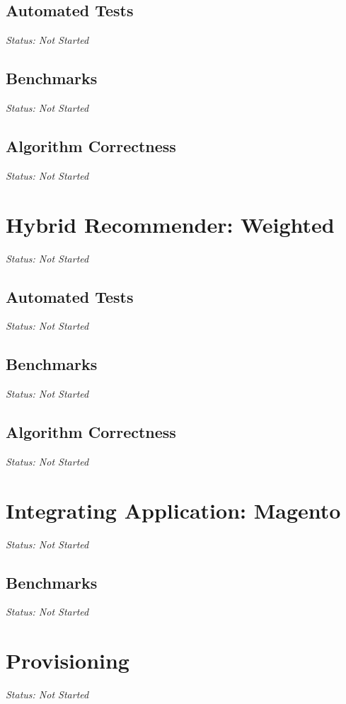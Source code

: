 \subsection{Automated Tests}

\emph{Status: Not Started}

\subsection{Benchmarks}

\emph{Status: Not Started}

\subsection{Algorithm Correctness}

\emph{Status: Not Started}

\section{Hybrid Recommender: Weighted}

\emph{Status: Not Started}

\subsection{Automated Tests}

\emph{Status: Not Started}

\subsection{Benchmarks}

\emph{Status: Not Started}

\subsection{Algorithm Correctness}

\emph{Status: Not Started}

\section{Integrating Application: Magento}

\emph{Status: Not Started}

\subsection{Benchmarks}

\emph{Status: Not Started}

\section{Provisioning}

\emph{Status: Not Started}